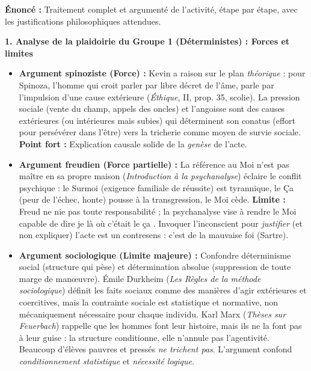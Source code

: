 \documentclass[11pt]{article}
\newcommand{\cle}[1]{{\popxbold\color{popdark}#1}}
\newcounter{popsec}
\newcounter{popsub}
\newcommand{\courssub}[1]{%
  \stepcounter{popsub}%
  \par\vspace{9pt}\noindent{\popxbold\fontsize{11.5}{13}\selectfont\color{popink}{\color{poporange}\thepopsec.\thepopsub}\hspace{6pt}#1}\par\nopagebreak\vspace{4pt}
}
\begin{document}
\courssub{Démarche et corrigé commenté}
\begin{exoresolu}
\textbf{Énoncé :} Traitement complet et argumenté de l'activité, étape par étape, avec les justifications philosophiques attendues.

\tcblower

\textbf{1. Analyse de la plaidoirie du Groupe 1 (Déterministes) : Forces et limites}

\begin{itemize}
    \item \textbf{Argument spinoziste (Force) :} Kevin a raison sur le plan \emph{théorique} : pour Spinoza, \guillemotleft l'homme qui croit parler par libre décret de l'âme, parle par l'impulsion d'une cause extérieure \guillemotright (\emph{Éthique}, II, prop. 35, scolie). La \cle{pression sociale} (vente du champ, appels des oncles) et l'\cle{angoisse} sont des causes extérieures (ou intérieures mais subies) qui déterminent son \cle{conatus} (effort pour persévérer dans l'être) vers la tricherie comme moyen de survie sociale. \textbf{Point fort :} Explication causale solide de la \emph{genèse} de l'acte.
    \item \textbf{Argument freudien (Force partielle) :} La référence au \guillemotleft Moi n'est pas maître en sa propre maison \guillemotright (\emph{Introduction à la psychanalyse}) éclaire le conflit psychique : le \cle{Surmoi} (exigence familiale de réussite) est tyrannique, le \cle{Ça} (peur de l'échec, honte) pousse à la transgression, le \cle{Moi} cède. \textbf{Limite :} Freud ne nie pas toute responsabilité ; la psychanalyse vise à \guillemotleft rendre le Moi capable de dire \guillemotleft je \guillemotright là où c'était le \guillemotleft ça \guillemotright. Invoquer l'inconscient pour \emph{justifier} (et non expliquer) l'acte est un contresens : c'est de la \cle{mauvaise foi} (Sartre).
    \item \textbf{Argument sociologique (Limite majeure) :} Confondre \cle{déterminisme social} (structure qui pèse) et \cle{détermination absolue} (suppression de toute marge de manœuvre). Émile Durkheim (\emph{Les Règles de la méthode sociologique}) définit les \guillemotleft faits sociaux \guillemotright comme des manières d'agir extérieures et coercitives, mais la contrainte sociale est statistique et normative, non mécaniquement nécessaire pour chaque individu. Karl Marx (\emph{Thèses sur Feuerbach}) rappelle que \guillemotleft les hommes font leur histoire, mais ils ne la font pas à leur guise \guillemotright : la structure conditionne, elle n'annule pas l'agentivité. Beaucoup d'élèves pauvres et pressés \emph{ne trichent pas}. L'argument confond \emph{conditionnement statistique} et \emph{nécessité logique}.
\end{itemize}


\end{exoresolu}
\end{document}
